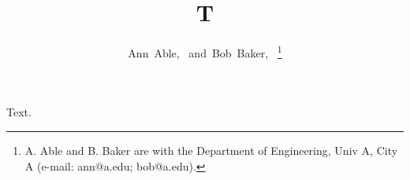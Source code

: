 \documentclass[journal]{IEEEtran}
\begin{document}
\title{T}
\author{Ann~Able,~
and~Bob~Baker,~
\thanks{A. Able and B. Baker are with the Department of Engineering, Univ A, City A (e-mail: ann@a.edu; bob@a.edu).}}
\maketitle
Text.
\end{document}
